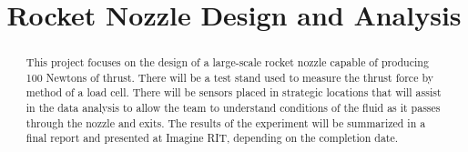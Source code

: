 \documentclass[conference]{IEEEtran} %
\title{Rocket Nozzle Design and Analysis}
\author{
  \IEEEauthorblockN{%
    James~Emerson~Parkus\IEEEauthorrefmark{1},  %
    David~Breen\IEEEauthorrefmark{2}
  }
  \IEEEauthorblockA{%
    RIT Space Exploration, Rochester Institute of Technology \\ %
    Rochester, N.Y. \\
    Email:
    \IEEEauthorrefmark{1}jep7631@rit.edu,
    \IEEEauthorrefmark{2}djb1410@rit.edu
  }

}
\begin{document}
\maketitle%

\begin{abstract}
  This project focuses on the design of a large-scale rocket nozzle capable of producing 100 Newtons of thrust. There will be a test stand used to measure the thrust force by method of a load cell.
  There will be sensors placed in strategic locations that will assist in the data analysis to allow the team to understand conditions of the fluid as it passes through the nozzle and exits. The results
  of the experiment will be summarized in a final report and presented at Imagine RIT, depending on the completion date.
\end{abstract}

\label{sec:nomenclature}
\newcommand{\nomunit}[1]{%
\renewcommand{\nomentryend}{\hspace*{\fill}#1}}
\renewcommand{\nompreamble}{

  }
\printnomenclature{}
\end{document}
